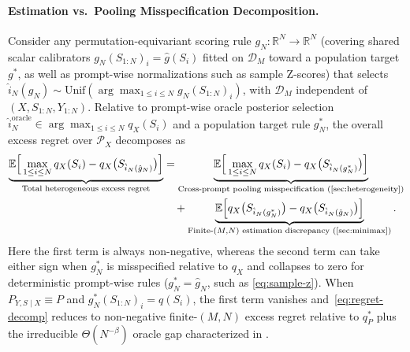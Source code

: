 \documentclass[10pt]{article}
\theoremstyle{plain}
\theoremstyle{definition}
\theoremstyle{remark}
\newcommand{\R}{\mathbb{R}}
\newcommand{\E}{\mathbb{E}}
\begin{document}
\paragraph{Estimation vs.\ Pooling Misspecification Decomposition.}
Consider any permutation-equivariant scoring rule $g_N : \R^N \to \R^N$ (covering shared scalar calibrators $g_N(S_{1:N})_i = \hat{g}(S_i)$ fitted on $\mathcal{D}_M$ toward a population target $g^*$, as well as prompt-wise normalizations such as sample Z-scores) that selects $\hat{i}_N(g_N) \sim \mathrm{Unif}(\arg\max_{1\le i\le N} g_N(S_{1:N})_i)$, with $\mathcal{D}_M$ independent of $(X, S_{1:N}, Y_{1:N})$. Relative to prompt-wise oracle posterior selection $\hat{i}_N^{\mathrm{oracle}} \in \arg\max_{1\le i\le N} q_X(S_i)$ and a population target rule $g_N^*$, the overall excess regret over $\mathcal{P}_X$ decomposes as
\begin{align}
\underbrace{\E\Big[\max_{1\le i\le N} q_X(S_i) - q_X\big(S_{\hat{i}_N(\hat{g}_N)}\big)\Big]}_{\text{Total heterogeneous excess regret}}
&= \underbrace{\E\Big[\max_{1\le i\le N} q_X(S_i) - q_X\big(S_{\hat{i}_N(g_N^*)}\big)\Big]}_{\text{Cross-prompt pooling misspecification (\Cref{sec:heterogeneity})}} \nonumber\\
&\quad + \underbrace{\E\Big[q_X\big(S_{\hat{i}_N(g_N^*)}\big) - q_X\big(S_{\hat{i}_N(\hat{g}_N)}\big)\Big]}_{\text{Finite-}(M,N)\text{ estimation discrepancy (\Cref{sec:minimax})}}.
\label{eq:regret-decomp}
\end{align}
Here the first term is always non-negative, whereas the second term can take either sign when $g_N^*$ is misspecified relative to $q_X$ and collapses to zero for deterministic prompt-wise rules ($g_N^* = \hat{g}_N$, such as \eqref{eq:sample-z}). When $P_{Y, S\mid X} \equiv P$ and $g_N^*(S_{1:N})_i = q(S_i)$, the first term vanishes and~\eqref{eq:regret-decomp} reduces to non-negative finite-$(M,N)$ excess regret relative to $q^*_P$ plus the irreducible $\Theta(N^{-\beta})$ oracle gap characterized in .
\end{document}
